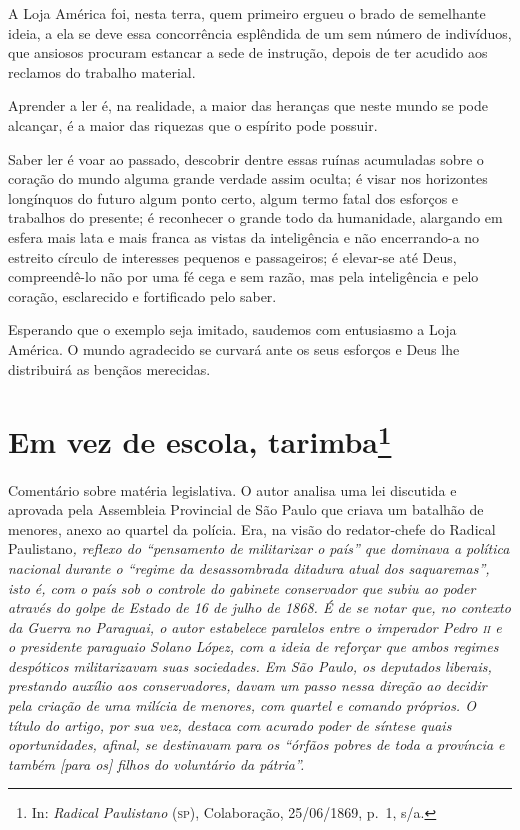 A Loja América foi, nesta terra, quem primeiro ergueu o brado de
semelhante ideia, a ela se deve essa concorrência esplêndida de um sem
número de indivíduos, que ansiosos procuram estancar a sede de
instrução, depois de ter acudido aos reclamos do trabalho material.

Aprender a ler é, na realidade, a maior das heranças que neste mundo se
pode alcançar, é a maior das riquezas que o espírito pode possuir.

Saber ler é voar ao passado, descobrir dentre essas ruínas acumuladas
sobre o coração do mundo alguma grande verdade assim oculta; é visar nos
horizontes longínquos do futuro algum ponto certo, algum termo fatal dos
esforços e trabalhos do presente; é reconhecer o grande todo da
humanidade, alargando em esfera mais lata e mais franca as vistas da
inteligência e não encerrando-a no estreito círculo de interesses
pequenos e passageiros; é elevar-se até Deus, compreendê-lo não por uma
fé cega e sem razão, mas pela inteligência e pelo coração, esclarecido e
fortificado pelo saber.

Esperando que o exemplo seja imitado, saudemos com entusiasmo a Loja
América. O mundo agradecido se curvará ante os seus esforços e Deus lhe
distribuirá as bençãos merecidas.

\chapter{Em vez de escola, tarimba\footnote{In: \emph{Radical Paulistano}
  (\textsc{sp}), Colaboração, 25/06/1869, p.~1, s/a.}}

\begin{didascalia}
Comentário sobre matéria legislativa. O autor analisa uma lei discutida
e aprovada pela Assembleia Provincial de São Paulo que criava um
batalhão de menores, anexo ao quartel da polícia. Era, na visão do
redator-chefe do Radical Paulistano\emph{, reflexo do ``pensamento de
militarizar o país'' que dominava a política nacional durante o ``regime
da desassombrada ditadura atual dos saquaremas'', isto é, com o país sob
o controle do gabinete conservador que subiu ao poder através do golpe
de Estado de 16 de julho de 1868. É de se notar que, no contexto da
Guerra no Paraguai, o autor estabelece paralelos entre o imperador Pedro
\textsc{ii} e o presidente paraguaio Solano López, com a ideia de reforçar que
ambos regimes despóticos militarizavam suas sociedades. Em São Paulo, os
deputados liberais, prestando auxílio aos conservadores, davam um passo
nessa direção ao decidir pela criação de uma milícia de menores, com
quartel e comando próprios. O título do artigo, por sua vez, destaca com
acurado poder de síntese quais oportunidades, afinal, se destinavam para
os ``órfãos pobres de toda a província e também {[}para os{]} filhos do
voluntário da pátria''.}
\end{didascalia}


